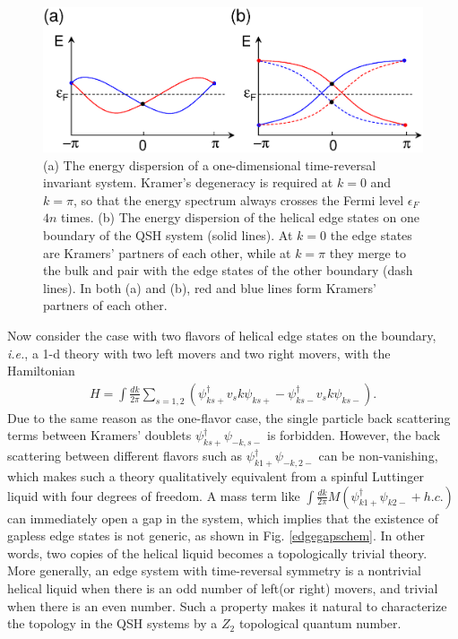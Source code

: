 \documentclass{article}
\begin{document}
\begin{figure}[h!]
\centering
\includegraphics[scale=0.42]{80608Fig04.eps}
\caption{(a) The energy dispersion of a one-dimensional
time-reversal invariant system. Kramer's degeneracy is required at
$k=0$ and $k=\pi$, so that the energy spectrum always crosses the
Fermi level $\epsilon_F$  $4n$ times. (b) The energy dispersion of
the helical edge states on one boundary of the QSH system (solid
lines). At $k=0$ the edge states are Kramers' partners of each
other, while at $k=\pi$ they merge to the bulk and pair with the
edge states of the other boundary (dash lines). In both (a) and (b),
red and blue lines form Kramers' partners of each other.}
\label{nogotheorem}
\end{figure}


Now consider the case with two flavors of helical edge states on
the boundary, {\em i.e.}, a 1-d theory with two left movers and
two right movers, with the Hamiltonian
\begin{eqnarray}
H=\int\frac{dk}{2\pi}\sum_{s=1,2}\left(\psi^\dagger_{ks+}v_sk\psi_{ks+}-\psi^\dagger_{ks-}v_sk\psi_{ks-}\right).\nonumber
\end{eqnarray}
Due to the same reason as the one-flavor case, the single particle
back scattering terms between Kramers' doublets
$\psi^\dagger_{ks+}\psi^{\ }_{-k,s-}$ is forbidden. However, the
back scattering between different flavors such as
$\psi^\dagger_{k1+}\psi^{\ }_{-k,2-}$ can be non-vanishing, which
makes such a theory qualitatively equivalent from a spinful
Luttinger liquid with four degrees of freedom. A mass term like
$\int \frac{dk}{2\pi}M\left(\psi^\dagger_{k1+}\psi^{\
}_{k2-}+h.c.\right)$ can immediately open a gap in the system,
which implies that the existence of gapless edge states is not
generic, as shown in Fig. \ref{edgegapschem}. In other words, two
copies of the helical liquid becomes a topologically trivial
theory. More generally, an edge system with time-reversal symmetry
is a nontrivial helical liquid when there is an odd number of
left(or right) movers, and trivial when there is an even number.
Such a property makes it natural to characterize the topology in
the QSH systems by a $Z_2$ topological quantum number.
\end{document}
